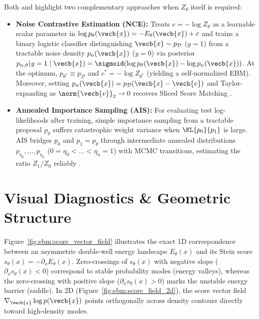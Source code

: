 \documentclass[../../../../master.tex]{subfiles}
\begin{document}
\begin{crossbook}
Both  and  highlight two complementary approaches when $Z_\theta$ itself is required:
\begin{itemize}
  \item \textbf{Noise Contrastive Estimation (NCE):} Treats $c = -\log Z_\theta$ as a learnable scalar parameter in $\log p_\theta(\vecb{x}) = -E_\theta(\vecb{x}) + c$ and trains a binary logistic classifier distinguishing $\vecb{x} \sim p_{\mathcal{D}}$ ($y=1$) from a tractable noise density $p_n(\vecb{x})$ ($y=0$) via posterior $p_{n,\theta}(y=1\mid\vecb{x}) = \sigmoid(\log p_\theta(\vecb{x}) - \log p_n(\vecb{x}))$. At the optimum, $p_{\theta^*} \equiv p_{\mathcal{D}}$ and $c^* = -\log Z_{\theta^*}$ (yielding a self-normalized EBM). Moreover, setting $p_n(\vecb{x}) = p_{\mathcal{D}}(\vecb{x}-\vecb{v})$ and Taylor-expanding as $\norm{\vecb{v}}_2 \to 0$ recovers Sliced Score Matching .
  \item \textbf{Annealed Importance Sampling (AIS):} For evaluating test log-likelihoods after training, simple importance sampling from a tractable proposal $p_0$ suffers catastrophic weight variance when $\KL{p_0}{p_1}$ is large. AIS bridges $p_0$ and $p_1 = p_\theta$ through intermediate annealed distributions $p_{\eta_0}, \dots, p_{\eta_n}$ ($0 = \eta_0 < \dots < \eta_n = 1$) with MCMC transitions, estimating the ratio $Z_1 / Z_0$ reliably .
\end{itemize}
\end{crossbook}

\section{Visual Diagnostics \& Geometric Structure}
\label{sec:ebm:visuals}

Figure~\ref{fig:ebm:score_vector_field} illustrates the exact 1D correspondence between an asymmetric double-well energy landscape $E_\theta(x)$ and its Stein score $s_\theta(x) = -\partial_x E_\theta(x)$. Zero-crossings of $s_\theta(x)$ with negative slope ($\partial_x s_\theta(x) < 0$) correspond to stable probability modes (energy valleys), whereas the zero-crossing with positive slope ($\partial_x s_\theta(x) > 0$) marks the unstable energy barrier (saddle). In 2D (Figure~\ref{fig:ebm:score_field_2d}), the score vector field $\nabla_{\vecb{x}}\log p(\vecb{x})$ points orthogonally across density contours directly toward high-density modes.
\end{document}
